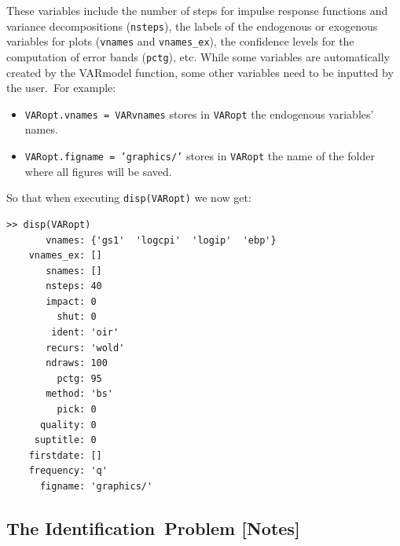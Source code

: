 \documentclass[10pt]{article}
\begin{document}
These variables include the number of steps for impulse response functions
and variance decompositions (\texttt{nsteps}), the labels of the endogenous
or exogenous variables for plots (\texttt{vnames} and \texttt{vnames\_ex}),
the confidence levels for the computation of error bands (\texttt{pctg}),
etc. While some variables are automatically created by the VARmodel
function, some other variables need to be inputted by the user.\ For example:

\begin{itemize}
\item \colorbox{script!80}{\texttt{VARopt.vnames = VARvnames}} stores in 
\texttt{VARopt} the endogenous variables' names.

\item \colorbox{script!80}{\texttt{VARopt.figname =
'graphics/'}} stores in \texttt{VARopt} the name of the folder where all
figures will be saved.
\end{itemize}

So that when executing \colorbox{script!80}{\texttt{disp(VARopt)}} we now
get:
\begin{verbatim}
>> disp(VARopt)
       vnames: {'gs1'  'logcpi'  'logip'  'ebp'}
    vnames_ex: []
       snames: []
       nsteps: 40
       impact: 0
         shut: 0
        ident: 'oir'
       recurs: 'wold'
       ndraws: 100
         pctg: 95
       method: 'bs'
         pick: 0
      quality: 0
     suptitle: 0
    firstdate: []
    frequency: 'q'
      figname: 'graphics/'
\end{verbatim}

\subsection{The Identification\ Problem {\color{note} {\protect\small
{[Notes]}}}}
\end{document}
